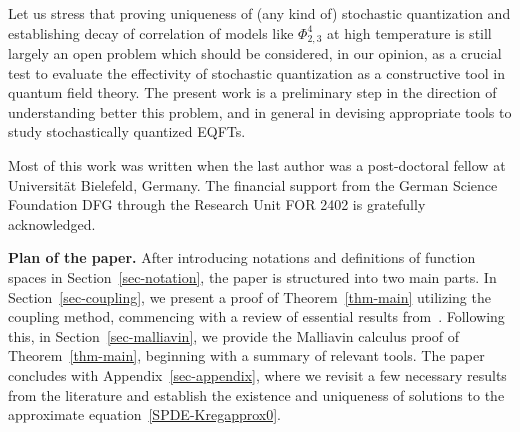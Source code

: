 \documentclass{article}
\newcommand{\tmstrong}[1]{\textbf{#1}}
\begin{document}
Let us stress that proving uniqueness of (any kind of) stochastic
quantization and establishing decay of correlation of models like $\Phi^4_{2,
3}$ at high temperature is still largely an open problem which should be
considered, in our opinion, as a crucial test to evaluate the effectivity of
stochastic quantization as a constructive tool in quantum field theory. The
present work is a preliminary step in the direction of understanding better
this problem, and in general in devising appropriate tools to study
stochastically quantized EQFTs.

\begin{acknowledgments*}
  Most of this work was written when the last author was a post-doctoral fellow at Universit{\"a}t Bielefeld, Germany. The financial support from the German Science Foundation DFG through the Research Unit FOR 2402 is gratefully acknowledged.
\end{acknowledgments*}


{\noindent}{\tmstrong{Plan of the paper. }}After introducing notations and definitions of function spaces in Section~\ref{sec-notation}, the paper is structured into two main parts. In Section~\ref{sec-coupling}, we present a proof of Theorem~\ref{thm-main} utilizing the coupling method, commencing with a review of essential results from~{\cite{AVG2021}}. Following this, in Section~\ref{sec-malliavin}, we provide the Malliavin calculus proof of Theorem~\ref{thm-main}, beginning with a summary of relevant tools. The paper concludes with Appendix~\ref{sec-appendix}, where we revisit a few necessary results from the literature and establish the existence and uniqueness of solutions to the approximate equation~\eqref{SPDE-Kregapprox0}.{\medskip}
\end{document}
